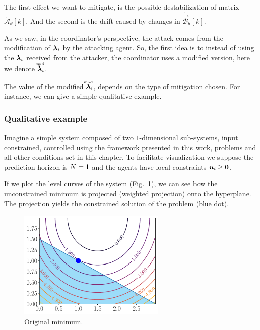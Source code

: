 \documentclass[../main.tex]{subfiles}
\begin{document}
The first effect we want to mitigate, is the possible destabilization of matrix $\tilde{\mathcal{A}_{\theta}}[k]$.
And the second is the drift caused by changes in $\tilde{\mathcal{\vec{B}}}_{\theta}[k]$.

As we saw, in the coordinator's perspective, the attack comes from the modification of $\boldsymbol{\lambda}_{i}$ by the attacking agent.
So, the first idea is to instead of using the $\boldsymbol{\lambda}_{i}$ received from the attacker, the coordinator uses a modified version, here we denote $\accentset{\text{mod}}{\boldsymbol{\lambda}}_{i}$.

The value of the modified $\accentset{\text{mod}}{\boldsymbol{\lambda}}_{i}$, depends on the type of mitigation chosen.
For instance, we can give a simple qualitative example.

\subsubsection{Qualitative example}\label{sec:qualitative-example}

Imagine a simple system composed of two \ltidt{} $1$-dimensional sub-systems, input constrained, controlled using the \dmpc{} framework presented in this work, \qp{} problems
and all other conditions set in this chapter.
To facilitate visualization we suppose the prediction horizon is $N=1$ and the agents have local constraints $\boldsymbol{u}_{i}\geq\mathbf{0}$.

If we plot the level curves of the system (Fig.~\ref{fig:original_minimum}), we can see how the unconstrained minimum is projected (weighted projection) onto the hyperplane.
The projection yields the constrained solution of the problem (blue dot).
\begin{figure}[h]
  \centering
  \includegraphics[width=7cm]{../img/resilient_eq/original-minimum.pdf}
  \caption{Original minimum.}\label{fig:original_minimum}
\end{figure}
\end{document}
